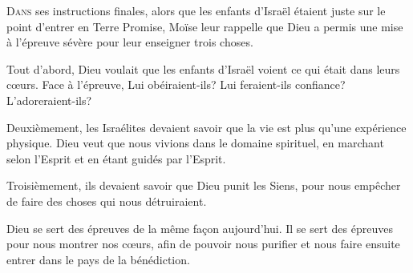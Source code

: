 

\lettrine{D}{ans} ses instructions finales,
 alors que les enfants d'Israël étaient juste sur le point
 d'entrer en Terre Promise, Moïse leur rappelle que Dieu
 a permis une mise à l'épreuve sévère pour leur enseigner trois choses.

Tout d'abord, Dieu voulait que les enfants d'Israël voient
 ce qui était dans leurs c\oe{}urs.
 Face à l'épreuve, Lui obéiraient-ils?
 Lui feraient-ils confiance? L'adoreraient-ils?


Deuxièmement, les Israélites devaient savoir que la vie
 est plus qu'une expérience physique.
 Dieu veut que nous vivions dans le domaine spirituel,
 en marchant selon l'Esprit et en étant guidés par l'Esprit.

Troisièmement, ils devaient savoir que Dieu punit les Siens,
 pour nous empêcher de faire des choses qui nous détruiraient.

Dieu se sert des épreuves de la même fa\c{c}on aujourd'hui.
 Il se sert des épreuves pour nous montrer nos c\oe{}urs,
 afin de pouvoir nous purifier et nous faire ensuite entrer
 dans le pays de la bénédiction. 

\dvrule





